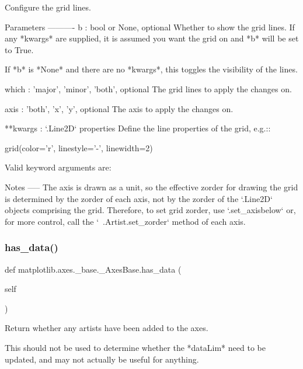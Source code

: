 \begin{DoxyVerb}Configure the grid lines.

Parameters
----------
b : bool or None, optional
    Whether to show the grid lines. If any *kwargs* are supplied,
    it is assumed you want the grid on and *b* will be set to True.

    If *b* is *None* and there are no *kwargs*, this toggles the
    visibility of the lines.

which : {'major', 'minor', 'both'}, optional
    The grid lines to apply the changes on.

axis : {'both', 'x', 'y'}, optional
    The axis to apply the changes on.

**kwargs : `.Line2D` properties
    Define the line properties of the grid, e.g.::

grid(color='r', linestyle='-', linewidth=2)

    Valid keyword arguments are:


Notes
-----
The axis is drawn as a unit, so the effective zorder for drawing the
grid is determined by the zorder of each axis, not by the zorder of the
`.Line2D` objects comprising the grid.  Therefore, to set grid zorder,
use `.set_axisbelow` or, for more control, call the
`~.Artist.set_zorder` method of each axis.
\end{DoxyVerb}
 \mbox{\label{classmatplotlib_1_1axes_1_1__base_1_1__AxesBase_ac2f0e104a3b9769b777abdeb51956aad}} 
\subsubsection{\texorpdfstring{has\+\_\+data()}{has\_data()}}
{\footnotesize\ttfamily def matplotlib.\+axes.\+\_\+base.\+\_\+\+Axes\+Base.\+has\+\_\+data (\begin{DoxyParamCaption}\item[{}]{self }\end{DoxyParamCaption})}

\begin{DoxyVerb}Return whether any artists have been added to the axes.

This should not be used to determine whether the *dataLim*
need to be updated, and may not actually be useful for
anything.
\end{DoxyVerb}
 \mbox{\label{classmatplotlib_1_1axes_1_1__base_1_1__AxesBase_aa956af6247b6e33d02b5e2e20aa290ff}} 
